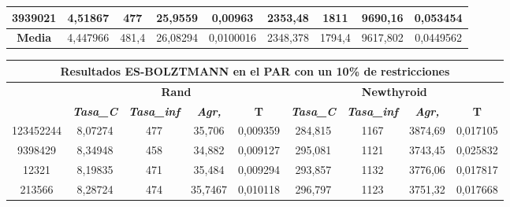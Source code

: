 \documentclass[12pt, spanish]{article}
\begin{document}
\begin{table}[H]
\begin{tabular}{|c|c|c|c|c|c|c|c|c|}
3939021           & 4,51867                   & 477                         & 25,9559                & 0,00963    & 2353,48                   & 1811                        & 9690,16                & 0,053454   \\ \hline
\textbf{Media}    & 4,447966                  & 481,4                       & 26,08294               & 0,0100016  & 2348,378                  & 1794,4                      & 9617,802               & 0,0449562  \\ \hline
\end{tabular}
\end{table}


\begin{table}[H]
\begin{tabular}{|c|c|c|c|c|c|c|c|c|}
\hline
\multicolumn{9}{|c|}{\textbf{Resultados ES-BOLZTMANN en el PAR con un 10\% de restricciones}}                                                                                                                     \\ \hline
\multirow{2}{*}{} & \multicolumn{4}{c|}{\textbf{Rand}}                                                            & \multicolumn{4}{c|}{\textbf{Newthyroid}}                                                      \\ \cline{2-9} 
                  & \textit{\textbf{Tasa\_C}} & \textit{\textbf{Tasa\_inf}} & \textit{\textbf{Agr,}} & \textbf{T} & \textit{\textbf{Tasa\_C}} & \textit{\textbf{Tasa\_inf}} & \textit{\textbf{Agr,}} & \textbf{T} \\ \hline
123452244         & 8,07274                   & 477                         & 35,706                 & 0,009359   & 284,815                   & 1167                        & 3874,69                & 0,017105   \\ \hline
9398429           & 8,34948                   & 458                         & 34,882                 & 0,009127   & 295,081                   & 1121                        & 3743,45                & 0,025832   \\ \hline
12321             & 8,19835                   & 471                         & 35,484                 & 0,009294   & 293,857                   & 1132                        & 3776,06                & 0,017817   \\ \hline
213566            & 8,28724                   & 474                         & 35,7467                & 0,010118   & 296,797                   & 1123                        & 3751,32                & 0,017668   \\ \hline

\end{tabular}
\end{table}
\end{document}
